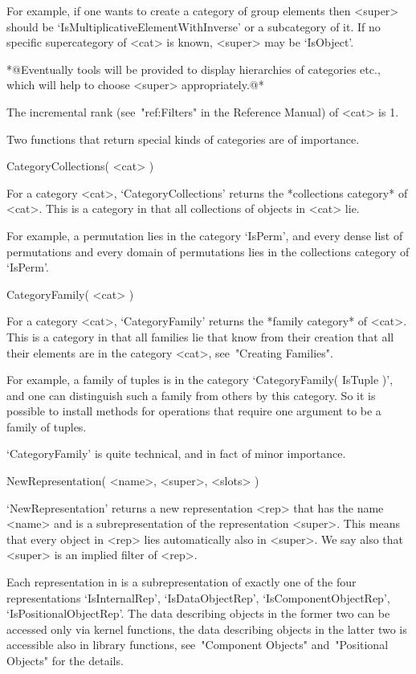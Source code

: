 For example, if one wants to create a category of group elements
then <super> should be `IsMultiplicativeElementWithInverse' or a
subcategory of it.
If no specific supercategory of <cat> is known,
<super> may be `IsObject'.

*@Eventually tools will be provided to display hierarchies of
categories etc.,
which will help to choose <super> appropriately.@*

The incremental rank (see~"ref:Filters" in the Reference Manual)
of <cat> is 1.

Two functions that return special kinds of categories are of importance.

\>CategoryCollections( <cat> )

For a category <cat>,
`CategoryCollections' returns the *collections category* of <cat>.
This is a category in that all collections of objects in <cat> lie.

For example, a permutation lies in the category `IsPerm',
and every dense list of permutations and every domain of permutations
lies in the collections category of `IsPerm'.

\>CategoryFamily( <cat> )

For a category <cat>,
`CategoryFamily' returns the *family category* of <cat>.
This is a category in that all families lie that know from their
creation that all their elements are in the category <cat>,
see~"Creating Families".

For example, a family of tuples is in the category
`CategoryFamily( IsTuple )',
and one can distinguish such a family from others by this category.
So it is possible to install methods for operations that require one
argument to be a family of tuples.

`CategoryFamily' is quite technical, and in fact of minor importance.



\>NewRepresentation( <name>, <super>, <slots> )

`NewRepresentation' returns a new representation <rep> that has the name
<name> and is a subrepresentation of the representation <super>.
This means that every object in <rep> lies automatically also in <super>.
We say also that <super> is an implied filter of <rep>.

Each representation in {\GAP} is a subrepresentation of exactly one
of the four representations `IsInternalRep', `IsDataObjectRep',
`IsComponentObjectRep', `IsPositionalObjectRep'.
The data describing objects in the former two can be accessed only via
{\GAP} kernel functions, the data describing objects in the latter two
is accessible also in library functions, see~"Component Objects"
and~"Positional Objects" for the details.

